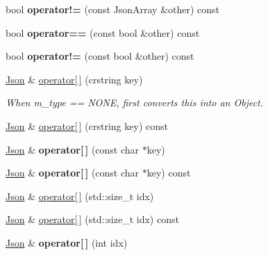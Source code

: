 \begin{DoxyCompactItemize}
bool {\bfseries operator!=} (const Json\+Array \&other) const
\item 
\mbox{\label{classnta_1_1utils_1_1Json_a5a66e88580ae3c456d16d8ec4d2d4556}} 
bool {\bfseries operator==} (const bool \&other) const
\item 
\mbox{\label{classnta_1_1utils_1_1Json_a05bb2f19f7b4239c1bbe718e8350c8d0}} 
bool {\bfseries operator!=} (const bool \&other) const
\item 
\hyperlink{classnta_1_1utils_1_1Json}{Json} \& \hyperlink{classnta_1_1utils_1_1Json_adf2d340a2bf7d59c537e398a1be66cf7}{operator\mbox{[}$\,$\mbox{]}} (crstring key)
\begin{DoxyCompactList}\small\item\em When m\+\_\+type == N\+O\+NE, first converts this into an Object. \end{DoxyCompactList}\item 
\hyperlink{classnta_1_1utils_1_1Json}{Json} \& \hyperlink{classnta_1_1utils_1_1Json_ab3b51a07ebed90330c98fd8e20785781}{operator\mbox{[}$\,$\mbox{]}} (crstring key) const
\item 
\mbox{\label{classnta_1_1utils_1_1Json_a4dcba3e4e113c3204212fea031725c9c}} 
\hyperlink{classnta_1_1utils_1_1Json}{Json} \& {\bfseries operator\mbox{[}$\,$\mbox{]}} (const char $\ast$key)
\item 
\mbox{\label{classnta_1_1utils_1_1Json_adf46f886ad73e0cacb7d0e5cc40841b3}} 
\hyperlink{classnta_1_1utils_1_1Json}{Json} \& {\bfseries operator\mbox{[}$\,$\mbox{]}} (const char $\ast$key) const
\item 
\hyperlink{classnta_1_1utils_1_1Json}{Json} \& \hyperlink{classnta_1_1utils_1_1Json_a236b5885612b74c21fbad169b21eaf55}{operator\mbox{[}$\,$\mbox{]}} (std\+::size\+\_\+t idx)
\item 
\hyperlink{classnta_1_1utils_1_1Json}{Json} \& \hyperlink{classnta_1_1utils_1_1Json_a893f191111e604995488d147aaa711f8}{operator\mbox{[}$\,$\mbox{]}} (std\+::size\+\_\+t idx) const
\item 
\mbox{\label{classnta_1_1utils_1_1Json_a7d094a2061036a579a63923ae30171a4}} 
\hyperlink{classnta_1_1utils_1_1Json}{Json} \& {\bfseries operator\mbox{[}$\,$\mbox{]}} (int idx)
\item 

\end{DoxyCompactItemize}
